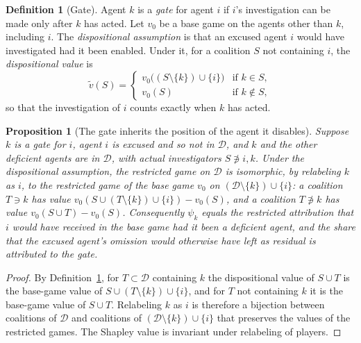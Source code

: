 \documentclass[11pt]{article}
\newcommand{\Dfc}{\mathcal D}
\theoremstyle{plain}
\newtheorem{proposition}{Proposition}
\theoremstyle{definition}
\newtheorem{definition}{Definition}
\begin{document}
\begin{definition}[Gate]\label{def:gate}
Agent $k$ is a \emph{gate} for agent $i$ if $i$'s investigation can be made only after $k$ has acted. Let $v_0$ be a base game on the agents other than $k$, including $i$. The \emph{dispositional assumption} is that an excused agent $i$ would have investigated had it been enabled. Under it, for a coalition $S$ not containing $i$, the \emph{dispositional value} is
\[
\tilde v(S)=\begin{cases}v_0\bigl((S\setminus\{k\})\cup\{i\}\bigr)&\text{if }k\in S,\\ v_0(S)&\text{if }k\notin S,\end{cases}
\]
so that the investigation of $i$ counts exactly when $k$ has acted.
\end{definition}

\begin{proposition}[The gate inherits the position of the agent it disables]\label{prop:gate}
Suppose $k$ is a gate for $i$, agent $i$ is excused and so not in $\Dfc$, and $k$ and the other deficient agents are in $\Dfc$, with actual investigators $S\not\ni i,k$. Under the dispositional assumption, the restricted game on $\Dfc$ is isomorphic, by relabeling $k$ as $i$, to the restricted game of the base game $v_0$ on $(\Dfc\setminus\{k\})\cup\{i\}$: a coalition $T\ni k$ has value $v_0(S\cup(T\setminus\{k\})\cup\{i\})-v_0(S)$, and a coalition $T\not\ni k$ has value $v_0(S\cup T)-v_0(S)$. Consequently $\psi_k$ equals the restricted attribution that $i$ would have received in the base game had it been a deficient agent, and the share that the excused agent's omission would otherwise have left as residual is attributed to the gate.
\end{proposition}

\begin{proof}
By Definition~\ref{def:gate}, for $T\subset\Dfc$ containing $k$ the dispositional value of $S\cup T$ is the base-game value of $S\cup(T\setminus\{k\})\cup\{i\}$, and for $T$ not containing $k$ it is the base-game value of $S\cup T$. Relabeling $k$ as $i$ is therefore a bijection between coalitions of $\Dfc$ and coalitions of $(\Dfc\setminus\{k\})\cup\{i\}$ that preserves the values of the restricted games. The Shapley value is invariant under relabeling of players.
\end{proof}
\end{document}
